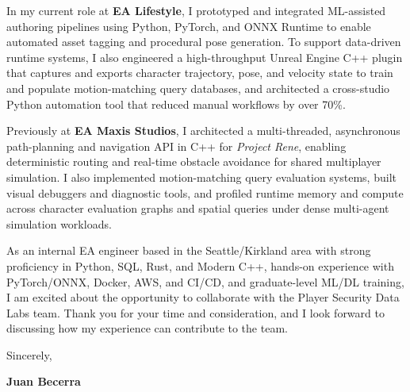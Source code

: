 \documentclass[letterpaper,11pt]{article}
\begin{document}
In my current role at \textbf{EA Lifestyle}, I prototyped and integrated ML-assisted authoring 
pipelines using Python, PyTorch, and ONNX Runtime to enable automated asset tagging and 
procedural pose generation. To support data-driven runtime systems, I also engineered a 
high-throughput Unreal Engine C++ plugin that captures and exports character trajectory, pose, 
and velocity state to train and populate motion-matching query databases, and architected a 
cross-studio Python automation tool that reduced manual workflows by over 70\%.

Previously at \textbf{EA Maxis Studios}, I architected a multi-threaded, asynchronous 
path-planning and navigation API in C++ for \emph{Project Rene}, enabling deterministic routing 
and real-time obstacle avoidance for shared multiplayer simulation. I also implemented 
motion-matching query evaluation systems, built visual debuggers and diagnostic tools, and 
profiled runtime memory and compute across character evaluation graphs and spatial queries under 
dense multi-agent simulation workloads.

As an internal EA engineer based in the Seattle/Kirkland area with strong proficiency in Python, 
SQL, Rust, and Modern C++, hands-on experience with PyTorch/ONNX, Docker, AWS, and CI/CD, and 
graduate-level ML/DL training, I am excited about the opportunity to collaborate with the Player 
Security Data Labs team. Thank you for your time and consideration, and I look forward to 
discussing how my experience can contribute to the team.

\vspace{10pt}
\noindent Sincerely,

\vspace{14pt}
\noindent \textbf{Juan Becerra}
\end{document}
